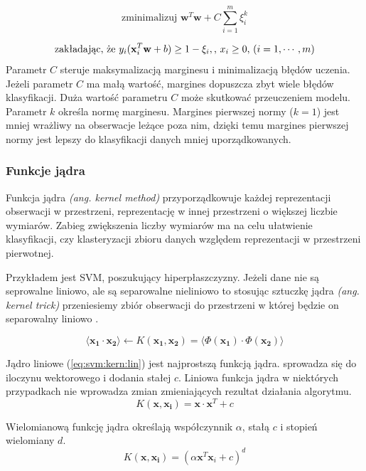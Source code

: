 \documentclass[a4paper,12pt,twoside,openany]{report}
\newcommand{\ang}[1]{\textit{(ang. #1)}}
\newcommand{\Eq}[1]{(\ref{#1})}
\renewcommand{\vec}[1]{\bm{#1}}
\begin{document}
\begin{equation}
\mbox{zminimalizuj } {\vec w}^T {\vec w}+C\sum_{i=1}^m \xi_i^k
\end{equation}

\begin{equation}
	\mbox{zakładając, że }  y_i ({\bf x}_i^T {\bf w}+b) \ge 1-\xi_i,
	\mbox{, }x_i \ge 0 \mbox{, }(i=1,\cdots,m)
\end{equation}
Parametr $C$ steruje maksymalizacją marginesu i minimalizacją błędów uczenia.
Jeżeli parametr $C$ ma małą wartość, margines dopuszcza zbyt wiele błędów klasyfikacji.
Duża wartość parametru $C$ może skutkować przeuczeniem modelu.
Parametr $k$ określa normę marginesu. 
Margines pierwszej normy ($k = 1$) jest mniej wrażliwy na obserwacje leżące poza nim,
dzięki temu margines pierwszej normy jest lepszy do klasyfikacji danych mniej uporządkowanych.

\subsubsection{Funkcje jądra}
Funkcja jądra \ang{kernel method} 
przyporządkowuje każdej reprezentacji obserwacji w przestrzeni,
reprezentację w innej przestrzeni o większej liczbie wymiarów.
Zabieg zwiększenia liczby wymiarów ma na celu ułatwienie 
klasyfikacji, czy klasteryzacji zbioru danych względem
reprezentacji w przestrzeni pierwotnej. 

Przykładem jest SVM, poszukujący hiperpłaszczyzny.
Jeżeli dane nie są seprowalne liniowo,
ale są separowalne nieliniowo to stosując sztuczkę jądra \ang{kernel trick} 
przeniesiemy zbiór obserwacji do przestrzeni w której będzie on separowalny liniowo \cite{Patle2013}.

\begin{equation}
	\langle \vec{x_1} \cdot \vec{x_2} \rangle \gets K(\vec{x_1}, \vec{x_2}) = \langle \Phi(\vec{x_1}) \cdot \Phi(\vec{x_2}) \rangle
\end{equation}

Jądro liniowe \Eq{eq:svm:kern:lin} jest najprostszą funkcją jądra. 
sprowadza się do iloczynu wektorowego i dodania stałej $c$.
Liniowa funkcja jądra w niektórych przypadkach nie wprowadza zmian zmieniających rezultat działania algorytmu.
\begin{equation}
	\label{eq:svm:kern:lin}
	K(\vec x, \vec{x_i}) = \vec x \cdot \vec x ^ T + c
\end{equation}

Wielomianową funkcję jądra określają współczynnik $\alpha$, stałą $c$ i stopień wielomiany $d$.
\begin{equation}
	\label{eq:svm:kern:poly}
	K(\vec x, \vec{x_i}) = (\alpha \vec x^T \vec x_i + c)^d 
\end{equation}
\end{document}

